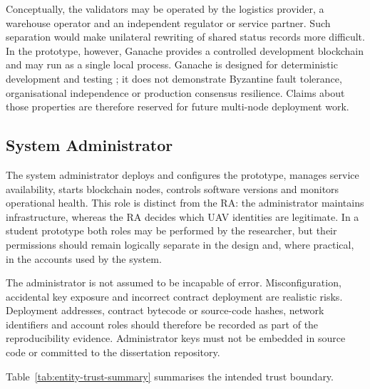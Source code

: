 Conceptually, the validators may be operated by the logistics provider, a warehouse operator and an independent regulator or service partner. Such separation would make unilateral rewriting of shared status records more difficult. In the prototype, however, Ganache provides a controlled development blockchain and may run as a single local process. Ganache is designed for deterministic development and testing \cite{GanacheDocumentation}; it does not demonstrate Byzantine fault tolerance, organisational independence or production consensus resilience. Claims about those properties are therefore reserved for future multi-node deployment work.

\subsection{System Administrator}
\label{subsec:system-administrator}

The system administrator deploys and configures the prototype, manages service availability, starts blockchain nodes, controls software versions and monitors operational health. This role is distinct from the RA: the administrator maintains infrastructure, whereas the RA decides which UAV identities are legitimate. In a student prototype both roles may be performed by the researcher, but their permissions should remain logically separate in the design and, where practical, in the accounts used by the system.

The administrator is not assumed to be incapable of error. Misconfiguration, accidental key exposure and incorrect contract deployment are realistic risks. Deployment addresses, contract bytecode or source-code hashes, network identifiers and account roles should therefore be recorded as part of the reproducibility evidence. Administrator keys must not be embedded in source code or committed to the dissertation repository.

Table~\ref{tab:entity-trust-summary} summarises the intended trust boundary.

